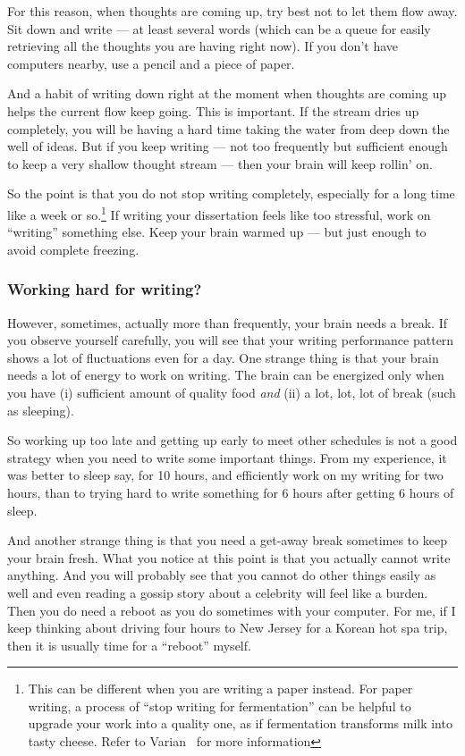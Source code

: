 \documentclass[11pt]{article}
\begin{document}
For this reason, when thoughts are coming up, try best not to let them flow
away. Sit down and write --- at least several words (which can be a queue for
easily retrieving all the thoughts you are having right now). If you don't
have computers nearby, use a pencil and a piece of paper. 

And a habit of writing down right at the moment when thoughts are coming up
helps the current flow keep going. This is important. If the stream dries up
completely, you will be having a hard time taking the water from deep down the
well of ideas.  But if you keep writing --- not too frequently but sufficient
enough to keep a very shallow thought stream --- then your brain will keep
rollin' on.

So the point is that you do not stop writing completely, especially for a long
time like a week or so.\footnote{This can be different when you
    are writing a paper instead. For paper writing, a process of ``stop
    writing for fermentation'' can be helpful to upgrade your work into a
quality one, as if fermentation transforms milk into tasty cheese. Refer to
Varian~\cite{varian-building-model} for more information} If writing your dissertation feels like
too stressful, work on ``writing'' something else. Keep your brain warmed up
--- but just enough to avoid complete freezing. 

\subsubsection{Working hard for writing?}

However, sometimes, actually more than frequently, your brain needs a break.
If you observe yourself carefully, you will see that your writing performance
pattern shows a lot of fluctuations even for a day. One strange thing is that
your brain needs a lot of energy to work on writing. The brain can be
energized only when you have (i) sufficient amount of quality food \emph{and}
(ii) a lot, lot, lot of break (such as sleeping). 

So working up too late and getting up early to meet other schedules is not a
good strategy when you need to write some important things. From my
experience, it was better to sleep say, for 10 hours, and efficiently work on
my writing for two hours, than to trying hard to write something for 6 hours
after getting 6 hours of sleep. 

And another strange thing is that you need a get-away break sometimes to keep
your brain fresh. What you notice at this point is that you actually cannot
write anything. And you will probably see that you cannot do other things
easily as well and even reading a gossip story about a celebrity will feel like
a burden. Then you do need a reboot as you do sometimes with your computer.
For me, if I keep thinking about driving four hours to New Jersey for a Korean
hot spa trip, then it is usually time for a ``reboot'' myself. 
\end{document}
